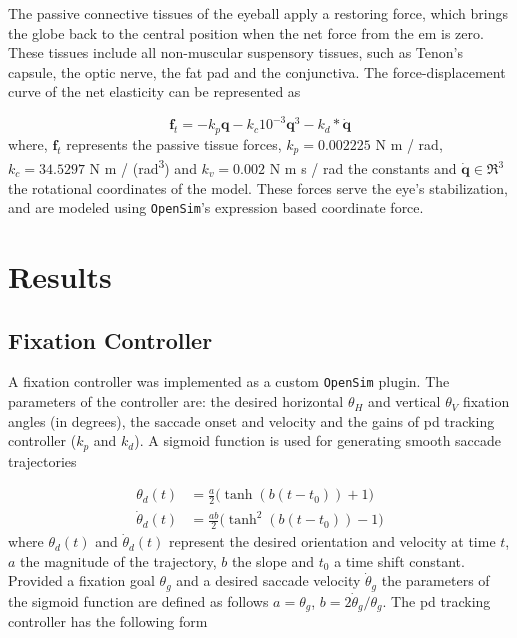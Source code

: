 \documentclass[11pt,a4paper,draft=false]{report}
\renewcommand*{\vec}[1]{\bm{#1}}
\newcommand{\R}[1]{\mathfrak{R}^{#1}}
\newcommand{\inr}[1]{\in\R{#1}}
\begin{document}
The passive connective tissues of the eyeball apply a restoring force, which
brings the globe back to the central position when the net force from the
\gls{em} is zero. These tissues include all non-muscular suspensory tissues,
such as Tenon’s capsule, the optic nerve, the fat pad and the conjunctiva. The
force-displacement curve of the net elasticity can be represented as

\begin{equation}\label{equ:passive-tissue}
  \vec{f}_t = -k_p \vec{q} - k_c 10^{-3} \vec{q}^3 - k_d * \vec{\dot{q}}
\end{equation}
% 
where, $\vec{f}_t$ represents the passive tissue forces, $k_p= 0.002225$ N m /
rad, $k_c= 34.5297$ N m / (rad\textsuperscript{3}) and $k_v= 0.002$ N m s / rad
the constants and $\vec{\dot{q}} \inr{3}$ the rotational coordinates of the
model. These forces serve the eye’s stabilization, and are modeled using
\texttt{OpenSim}'s expression based coordinate force.


\section*{Results}\label{sec:results}

\subsection*{Fixation Controller}\label{sec:fixation-controller}

A fixation controller was implemented as a custom \texttt{OpenSim} plugin. The
parameters of the controller are: the desired horizontal $\theta_H$ and vertical
$\theta_V$ fixation angles (in degrees), the saccade onset and velocity and the
gains of \gls{pd} tracking controller ($k_p$ and $k_d $). A sigmoid function is
used for generating smooth saccade trajectories

\begin{equation}\label{equ:sigmoid}
  \begin{aligned}
    \theta_d(t) &= \frac{a}{2} \Big(\tanh(b (t - t_0)) + 1\Big) \\
    \dot{\theta}_d(t) &= \frac{a b}{2} \Big(\tanh^2(b (t - t_0)) - 1\Big) 
  \end{aligned}
\end{equation}
%
where $\theta_d(t)$ and $\dot{\theta}_d(t)$ represent the desired orientation
and velocity at time $t$, $a$ the magnitude of the trajectory, $b$ the slope and
$t_0$ a time shift constant. Provided a fixation goal $\theta_g$ and a desired
saccade velocity $\dot{\theta}_g$ the parameters of the sigmoid function are
defined as follows $a = \theta_g$, $b = 2 \dot{\theta}_g / \theta_g$. The
\gls{pd} tracking controller has the following form
\end{document}
